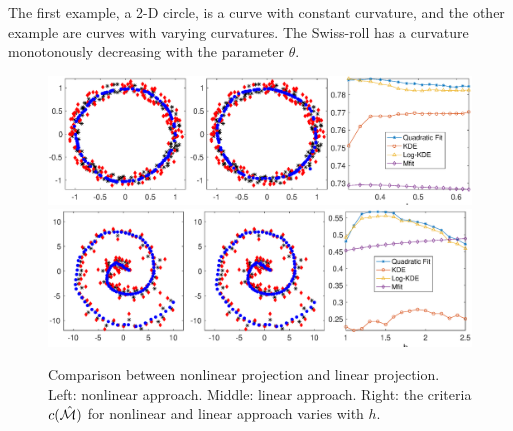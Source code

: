 \documentclass{article}
\theoremstyle{remark}
\newtheorem*{remark}{Remark}
\newtheorem{example}{Example}
\begin{document}
The first example, a 2-D circle, is a curve with constant curvature, and the other example are curves with varying curvatures. The Swiss-roll has a curvature monotonously decreasing with the parameter $\theta$. %
\begin{figure}[H] %
   \centering
    \includegraphics[width=\linewidth]{circle_result2.eps} 
     \includegraphics[width=\linewidth]{swiss_roll2.eps} 
     \vspace{-0.4cm}
   \caption{Comparison between nonlinear projection and linear projection. Left: nonlinear approach. Middle: linear approach. Right: the criteria $c(\hat{\cal M})$ for nonlinear and linear approach varies with $h$.}
   \label{fig:sin_curve}
\end{figure}
\end{document}
